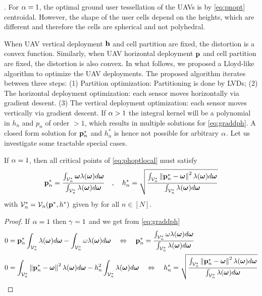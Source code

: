 \documentclass[smallabstract,smallcaptions]{dccpaper}
\newenvironment{remark}{\par\vspace{1.5ex}\noindent{\em Remark\/}.}{\par\vspace{1.5ex}}
\newcommand{\df}{\ensuremath{\lam}}         %
\newcommand{\bP}{\ensuremath{\vp}}          %
\newcommand{\bH}{\ensuremath{\vh}}          %
\newcommand{\Vor}{\ensuremath{\mathcal{V}}}         %
\begin{document}
%
\begin{remark}
  For $\alpha=1$, the optimal ground user tessellation of the UAVs is by \eqref{eq:pnopt} centroidal. However, the shape of
  the user cells depend on the heights, which are different and therefore the cells are spherical and not polyhedral. 
\end{remark}

When UAV vertical deployment $\bH$ and cell partition are fixed, the distortion is a convex function.  Similarly, when
UAV horizontal deployment $\bP$ and cell partition are fixed, the distortion is also convex.  In what follows,
we proposed a Lloyd-like algorithm to optimize the UAV deployments.  The proposed algorithm iterates between three
steps: (1) Partition optimization: Partitioning is done by LVDs; (2) The horizontal deployment optimization: each sensor
moves horizontally via gradient descent.  (3) The vertical deployment optimization: each sensor moves vertically via
gradient descent.
\fi %
If $\alpha>1$ the integral kernel will be a polynomial in $h_n$ and $p_n$ of order $>1$, which results in multiple
solutions for \eqref{eq:graddph}. A closed form solution for ${\mathbf p}_n^*$ and $h_n^*$ is hence not possible for arbitrary
$\alpha$. Let us investigate some tractable special cases.   
%
\begin{corollary}\label{cor:alponedifheight}
  If $\alpha=1$, then all critical points  of \eqref{eq:phoptlocal} must satisfy 
  \begin{align}
    \vp_n^* = \frac{\int_{\Vor^*_n} \vome \df(\vome)d\vome}{\int_{\Vor^*_n} \df(\vome)d\vome}\quad,\quad 
    h_n^* = \sqrt{\frac{\int_{\Vor^*_n}\Norm{\vp_n^*-\vome}^2 \df(\vome)d\vome}{\int_{\Vor^*_n} \df(\vome)d\vome}}\label{eq:pnhn}
  \end{align}
  with  $\Vor_n^*=\Vor_n(\vp^*,h^*)$ given by  for all $n\in[N]$.
\end{corollary}
%
\begin{proof}
  If $\alpha=1$ then $\gamma=1$ and we get from \eqref{eq:graddph}
  \begin{align}
    &0= \vp_n^*\int_{\Vor^*_n} \df(\vome)d\vome- \int_{\Vor_n^*} \ome\df(\vome)d\vome
   \quad \LRA\quad 
    \vp_n^*= \frac{\int_{\Vor_n^*} \ome\df(\vome)d\vome}{\int_{\Vor^*_n} \df(\vome)d\vome }\\
    &0= \int_{\Vor_n^*} \Norm{\vp_n^*-\vome}^2 \df(\vome) d\vome - h_n^2\int_{\Vor^*_n}  \df(\vome)d \vome
   \quad \LRA \quad
    h_n^*= \sqrt{\frac{\int_{\Vor_n^*} \Norm{\vp_n^*-\vome}^2\df(\vome)d\vome}{\int_{\Vor^*_n}  \df(\vome)d\vome }}
  \end{align}
\end{proof}
\fi %
%
\end{document}
